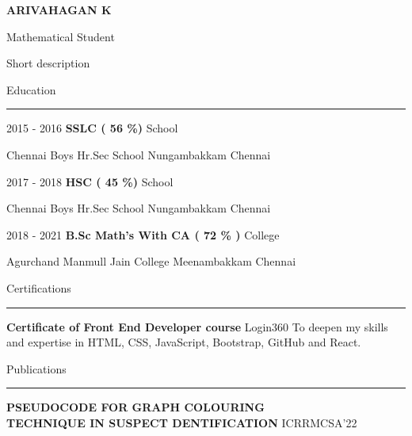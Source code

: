 \documentclass{letter}
\begin{document}
\begin{minipage}[t]{0.60\textwidth}
\setlength{\baselineskip}{1.5\baselineskip}
\vspace{0.5cm}
{\huge \fontsize{30}{20} \textbf{\MakeUppercase{ARIVAHAGAN K}}}

{\large \fontsize{13}{20} Mathematical Student}

\vspace{0.4cm}
 
\fontsize{15}{20} Short description

\vspace{0.4cm}

{\large Education}
\rule{\linewidth}{0.4pt}

{\small 2015 - 2016} \hspace{1cm}
{\large \textbf{SSLC ( 56 \%)}} \hspace{4cm} 
{\small School}

{\small Chennai Boys Hr.Sec School Nungambakkam Chennai}
\newline

{\small 2017 - 2018} \hspace{1cm}
{\large \textbf{HSC ( 45 \%)}} \hspace{4.4cm} 
{\small School}

{\small Chennai Boys Hr.Sec School Nungambakkam Chennai}
\newline

{\small 2018 - 2021} \hspace{1cm}
{\large \textbf{B.Sc Math's With CA ( 72 \% )}} \hspace{1cm} 
{\small College}

{\small Agurchand Manmull Jain College Meenambakkam Chennai}

\vspace{0.4cm}

{\large Certifications}
\rule{\linewidth}{0.4pt}

{\large \textbf{Certificate of Front End Developer course}} \hspace{1.1cm} 
{\small Login360}
{\small To deepen my skills and expertise in HTML, CSS, JavaScript, Bootstrap, GitHub and React.}
\vspace{0.4cm}

{\large Publications}
\rule{\linewidth}{0.4pt}

{\large \textbf{PSEUDOCODE FOR GRAPH COLOURING \\ TECHNIQUE IN  SUSPECT DENTIFICATION}} \hspace{0.2cm} 
{\small ICRRMCSA'22}


\end{minipage}
\end{document}
